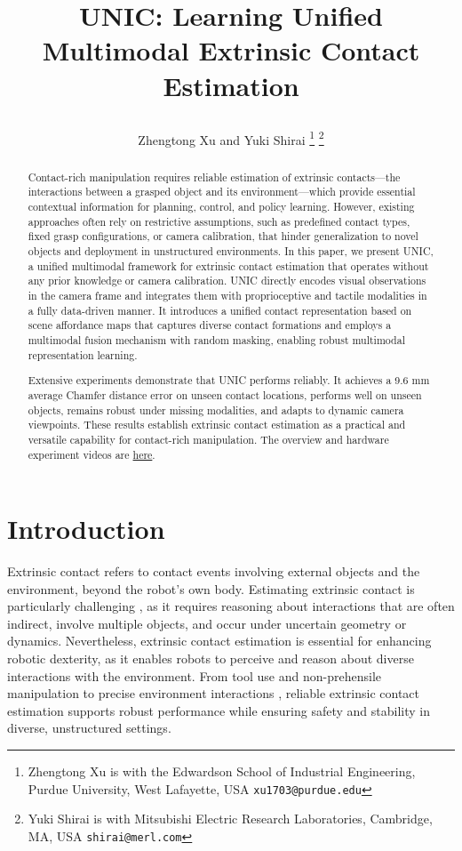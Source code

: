 \documentclass[letterpaper, 10 pt, conference]{ieeeconf}  %
\title{\LARGE \bf

UNIC: Learning Unified Multimodal Extrinsic Contact Estimation
}
\author{Zhengtong Xu and Yuki Shirai  
\thanks{Zhengtong Xu is with the Edwardson School of Industrial Engineering, Purdue University, West Lafayette, USA  {\tt\small xu1703@purdue.edu}}
\thanks{Yuki Shirai is with Mitsubishi Electric Research Laboratories, Cambridge, MA, USA {\tt\small shirai@merl.com}}
}
\newcommand{\unic}{\textsc{UNIC}}
\begin{document}
\maketitle
\thispagestyle{empty}
\pagestyle{empty}


\begin{abstract}

Contact-rich manipulation requires reliable estimation of extrinsic contacts—the interactions between a grasped object and its environment—which provide essential contextual information for planning, control, and policy learning. However, existing approaches often rely on restrictive assumptions, such as predefined contact types, fixed grasp configurations, or camera calibration, that hinder generalization to novel objects and deployment in unstructured environments. In this paper, we present \unic{}, a unified multimodal framework for extrinsic contact estimation that operates without any prior knowledge or camera calibration. \unic{} directly encodes visual observations in the camera frame and integrates them with proprioceptive and tactile modalities in a fully data-driven manner. It introduces a unified contact representation based on scene affordance maps that captures diverse contact formations and employs a multimodal fusion mechanism with random masking, enabling robust multimodal representation learning.

Extensive experiments demonstrate that \unic{} performs reliably. It achieves a 9.6 mm average Chamfer distance error on unseen contact locations, performs well on unseen objects, remains robust under missing modalities, and adapts to dynamic camera viewpoints. These results establish extrinsic contact estimation as a practical and versatile capability for contact-rich manipulation. The overview and hardware experiment videos are \href{https://youtu.be/xpMitkxN6Ls?si=7Vgj-aZ_P1wtnWZN}{here}.
\end{abstract}

\section{Introduction}\label{sec:intro}
Extrinsic contact \cite{ma2021extrinsic} refers to contact events involving external objects and the environment, beyond the robot’s own body. Estimating extrinsic contact is particularly challenging \cite{rodriguez2021unstable}, as it requires reasoning about interactions that are often indirect, involve multiple objects, and occur under uncertain geometry or dynamics. Nevertheless, extrinsic contact estimation is essential for enhancing robotic dexterity, as it enables robots to perceive and reason about diverse interactions with the environment. From tool use \cite{kim2024texterity,shirai2023tactile} and non-prehensile manipulation \cite{billard2019trends} to precise environment interactions \cite{higuera2023perceiving}, reliable extrinsic contact estimation supports robust performance while ensuring safety and stability in diverse, unstructured settings.
\end{document}
